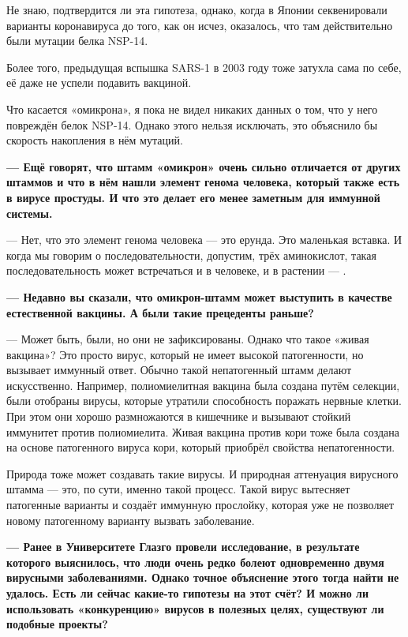 Не знаю, подтвердится ли эта гипотеза, однако, когда в Японии секвенировали варианты коронавируса до того, как он исчез, оказалось, что там действительно были мутации белка NSP-14.

Более того, предыдущая вспышка SARS-1 в 2003 году тоже затухла сама по себе, её даже не успели подавить вакциной.

Что касается «омикрона», я пока не видел никаких данных о том, что у него повреждён белок NSP-14. Однако этого нельзя исключать, это объяснило бы скорость накопления в нём мутаций.

{\bf — Ещё говорят, что штамм «омикрон» очень сильно отличается от других штаммов и что в нём нашли элемент генома человека, который также есть в вирусе простуды. И что это делает его менее заметным для иммунной системы. }

— Нет, что это элемент генома человека — это ерунда. Это маленькая вставка. И когда мы говорим о последовательности, допустим, трёх аминокислот, такая последовательность может встречаться и в человеке, и в растении — .

{\bf — Недавно вы сказали, что омикрон-штамм может выступить в качестве естественной вакцины. А были такие прецеденты раньше?}

—  Может быть, были, но они не зафиксированы. Однако что такое «живая вакцина»? Это просто вирус, который не имеет высокой патогенности, но вызывает иммунный ответ. Обычно такой непатогенный штамм делают искусственно. Например, полиомиелитная вакцина была создана путём селекции, были отобраны вирусы, которые утратили способность поражать нервные клетки. При этом они хорошо размножаются в кишечнике и вызывают стойкий иммунитет против полиомиелита. Живая вакцина против кори тоже была создана на основе патогенного вируса кори, который приобрёл свойства непатогенности.

Природа тоже может создавать такие вирусы. И природная аттенуация вирусного штамма — это, по сути, именно такой процесс. Такой вирус вытесняет патогенные варианты и создаёт иммунную прослойку, которая уже не позволяет новому патогенному варианту вызвать заболевание.

{\bf — Ранее в Университете Глазго провели исследование, в результате которого выяснилось, что люди очень редко болеют одновременно двумя вирусными заболеваниями. Однако точное объяснение этого тогда найти не удалось. Есть ли сейчас какие-то гипотезы на этот счёт? И можно ли использовать «конкуренцию» вирусов в полезных целях, существуют ли подобные проекты? }

